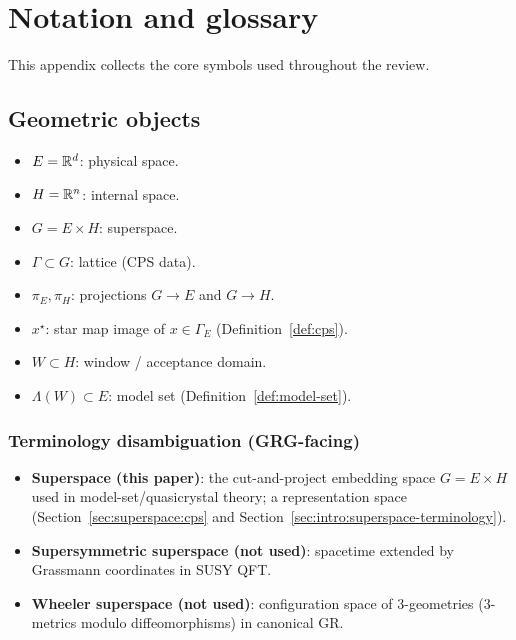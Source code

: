 \section{Notation and glossary}\label{sec:appendix:notation}

This appendix collects the core symbols used throughout the review.

\subsection{Geometric objects}
\begin{itemize}[leftmargin=*,itemsep=2pt]
  \item $E=\mathbb{R}^d$: physical space.
  \item $H=\mathbb{R}^n$: internal space.
  \item $G=E\times H$: superspace.
  \item $\Gamma\subset G$: lattice (CPS data).
  \item $\pi_E,\pi_H$: projections $G\to E$ and $G\to H$.
  \item $x^\star$: star map image of $x\in \Gamma_E$ (Definition~\ref{def:cps}).
  \item $W\subset H$: window / acceptance domain.
  \item $\Lambda(W)\subset E$: model set (Definition~\ref{def:model-set}).
\end{itemize}

\subsubsection*{Terminology disambiguation (GRG-facing)}
\begin{itemize}[leftmargin=*,itemsep=2pt]
  \item \textbf{Superspace (this paper)}: the cut-and-project embedding space $G=E\times H$ used in model-set/quasicrystal theory; a representation space (Section~\ref{sec:superspace:cps} and Section~\ref{sec:intro:superspace-terminology}).
  \item \textbf{Supersymmetric superspace (not used)}: spacetime extended by Grassmann coordinates in SUSY QFT.
  \item \textbf{Wheeler superspace (not used)}: configuration space of 3-geometries (3-metrics modulo diffeomorphisms) in canonical GR.
\end{itemize}


